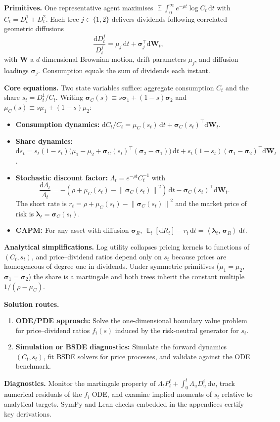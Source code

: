 ﻿\documentclass[11pt,letterpaper,oneside]{article}
\numberwithin{equation}{section}
\DeclareMathOperator{\E}{\mathbb{E}}
\newcommand{\1}{\mathbf{1}}
\newcommand{\diff}{\mathrm{d}}
\newcommand{\norm}[1]{\left\lVert #1\right\rVert}
\newcommand{\ip}[2]{\left\langle #1,\,#2\right\rangle}
\begin{document}
\begin{tcolorbox}[didacticstyle]
\textbf{Primitives.}
One representative agent maximises $\E\!\int_0^\infty e^{-\rho t}\log C_t\,\diff t$ with $C_t=D^1_t+D^2_t$. Each tree $j\in\{1,2\}$ delivers dividends following correlated geometric diffusions
\[
  \frac{\diff D^j_t}{D^j_t}=\mu_j\,\diff t+\bm{\sigma}_j^{\top}\diff \bm{W}_t,
\]
with $\bm{W}$ a $d$-dimensional Brownian motion, drift parameters $\mu_j$, and diffusion loadings $\bm{\sigma}_j$. Consumption equals the sum of dividends each instant.

\textbf{Core equations.} Two state variables suffice: aggregate consumption $C_t$ and the share $s_t=D^1_t/C_t$. Writing $\bm{\sigma}_C(s)\equiv s\bm{\sigma}_1+(1-s)\bm{\sigma}_2$ and $\mu_C(s)\equiv s\mu_1+(1-s)\mu_2$:
\begin{itemize}[leftmargin=1.25em]
  \item \textbf{Consumption dynamics:} $\diff C_t/C_t = \mu_C(s_t)\,\diff t + \bm{\sigma}_C(s_t)^{\top}\diff\bm{W}_t$.
  \item \textbf{Share dynamics:} $\diff s_t = s_t(1-s_t)\big(\mu_1-\mu_2+\bm{\sigma}_C(s_t)^{\top}(\bm{\sigma}_2-\bm{\sigma}_1)\big)\,\diff t + s_t(1-s_t)(\bm{\sigma}_1-\bm{\sigma}_2)^{\top}\diff\bm{W}_t$.
  \item \textbf{Stochastic discount factor:} $\Lambda_t=e^{-\rho t}C_t^{-1}$ with
  \[
    \frac{\diff \Lambda_t}{\Lambda_t}=-(\rho+\mu_C(s_t)-\norm{\bm{\sigma}_C(s_t)}^2)\,\diff t - \bm{\sigma}_C(s_t)^{\top}\diff \bm{W}_t.
  \]
  The short rate is $r_t=\rho+\mu_C(s_t)-\norm{\bm{\sigma}_C(s_t)}^2$ and the market price of risk is $\bm{\lambda}_t=\bm{\sigma}_C(s_t)$.
  \item \textbf{CAPM:} For any asset with diffusion $\bm{\sigma}_R$, $\E_t[\diff R_t]-r_t\,\diff t=\ip{\bm{\lambda}_t}{\bm{\sigma}_R}\,\diff t$.
\end{itemize}

\textbf{Analytical simplifications.} Log utility collapses pricing kernels to functions of $(C_t,s_t)$, and price--dividend ratios depend only on $s_t$ because prices are homogeneous of degree one in dividends. Under symmetric primitives ($\mu_1=\mu_2$, $\bm{\sigma}_1=\bm{\sigma}_2$) the share is a martingale and both trees inherit the constant multiple $1/(\rho-\mu_C)$.

\textbf{Solution routes.}
\begin{enumerate}[leftmargin=1.25em]
  \item \textbf{ODE/PDE approach:} Solve the one-dimensional boundary value problem for price--dividend ratios $f_i(s)$ induced by the risk-neutral generator for $s_t$.
  \item \textbf{Simulation or BSDE diagnostics:} Simulate the forward dynamics $(C_t,s_t)$, fit BSDE solvers for price processes, and validate against the ODE benchmark.
\end{enumerate}

\textbf{Diagnostics.} Monitor the martingale property of $\Lambda_t P^i_t+\int_0^t \Lambda_u D^i_u\,\diff u$, track numerical residuals of the $f_i$ ODE, and examine implied moments of $s_t$ relative to analytical targets. SymPy and Lean checks embedded in the appendices certify key derivations.
\end{tcolorbox}
\end{document}
